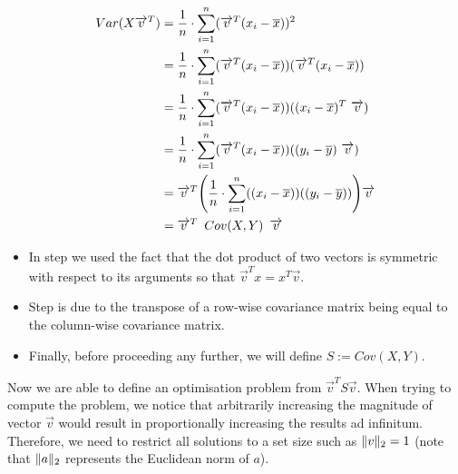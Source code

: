 \vspace{-25mm}
{
\begin{align}
	\label{formula:maxVarI}
	Var(X\overrightarrow{v}^T) &= \frac{1}{n} \cdot \displaystyle\sum_{i=1}^{n} (\overrightarrow{v}^T(x_i-\overline{x}))^2
	\\
	\label{formula:maxVarII}
	&= \frac{1}{n} \cdot \displaystyle\sum_{i=1}^{n} (\overrightarrow{v}^T(x_i-\overline{x})) (\overrightarrow{v}^T(x_i-\overline{x}))
	\\
	\label{formula:maxVarIII}
	&= \frac{1}{n} \cdot \displaystyle\sum_{i=1}^{n} (\overrightarrow{v}^T(x_i-\overline{x})) ((x_i-\overline{x})^T \ \overrightarrow{v})
	\\
	\label{formula:maxVarIV}
	&= \frac{1}{n} \cdot \displaystyle\sum_{i=1}^{n} (\overrightarrow{v}^T(x_i-\overline{x})) ((y_i-\overline{y}) \ \overrightarrow{v})
	\\
	\label{formula:maxVarV}
	&= \overrightarrow{v}^T \Bigg(\frac{1}{n} \cdot \displaystyle\sum_{i=1}^{n} ((x_i-\overline{x})) ((y_i-\overline{y}))\Bigg) \overrightarrow{v}
	\\
	\label{formula:maxVarVI}
	&= \overrightarrow{v}^T \enskip Cov(X,Y) \enskip \overrightarrow{v}
\end{align}
}

\vspace{-16mm}

\begin{itemize}
	\item In step  we used the fact that the dot product of two vectors is symmetric with respect to its arguments so that $\overrightarrow{v}^T x  = x^T\overrightarrow{v}$.
	\item Step  is due to the transpose of a row-wise covariance matrix being equal to the column-wise covariance matrix.
	\item Finally, before proceeding any further, we will define $S := Cov(X,Y)$.
\end{itemize}


\clearpage

Now we are able to define an optimisation problem from $\overrightarrow{v}^T S \overrightarrow{v}$.
When trying to compute the problem, we notice that arbitrarily increasing the magnitude of vector $\overrightarrow{v}$ would result in proportionally increasing the results ad infinitum.
Therefore, we need to restrict all solutions to a set size such as $\lVert v\rVert_2 = 1$ (note that $\lVert a\rVert_2$ represents the Euclidean norm of $a$).

